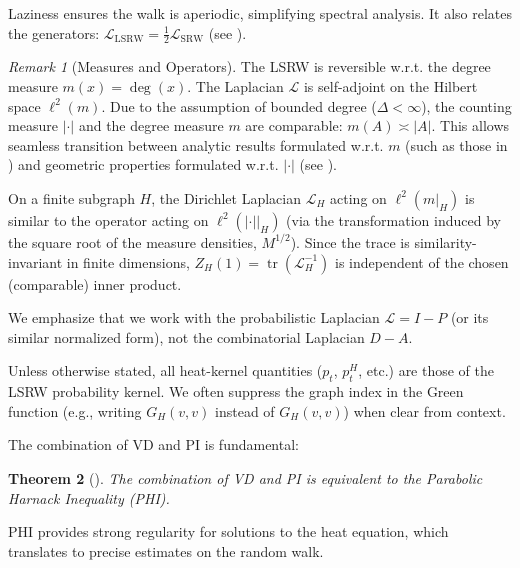 \documentclass{article}
\numberwithin{equation}{section}
\newtheorem{theorem}{Theorem}[section]
\theoremstyle{definition}
\theoremstyle{remark}
\newtheorem{remark}[theorem]{Remark}
\DeclareMathOperator{\tr}{tr}
\newcommand{\LL}{\mathcal{L}}
\begin{document}
Laziness ensures the walk is aperiodic, simplifying spectral analysis. It also relates the generators: $\LL_{\text{LSRW}} = \frac{1}{2} \LL_{\text{SRW}}$ (see ).

\begin{remark}[Measures and Operators]\label{rem:measures_operators}
The LSRW is reversible w.r.t. the degree measure $m(x)=\deg(x)$. The Laplacian $\LL$ is self-adjoint on the Hilbert space $\ell^2(m)$. Due to the assumption of bounded degree ($\Delta < \infty$), the counting measure $|\cdot|$ and the degree measure $m$ are comparable: $m(A) \asymp |A|$. This allows seamless transition between analytic results formulated w.r.t. $m$ (such as those in ) and geometric properties formulated w.r.t. $|\cdot|$ (see \cite{Coulhon03}).

On a finite subgraph $H$, the Dirichlet Laplacian $\LL_H$ acting on $\ell^2(m|_H)$ is similar to the operator acting on $\ell^2(|\cdot||_H)$ (via the transformation induced by the square root of the measure densities, $M^{1/2}$). Since the trace is similarity-invariant in finite dimensions, $Z_H(1) = \tr(\LL_H^{-1})$ is independent of the chosen (comparable) inner product.

We emphasize that we work with the probabilistic Laplacian $\LL=I-P$ (or its similar normalized form), not the combinatorial Laplacian $D-A$.

Unless otherwise stated, all heat-kernel quantities ($p_t$, $p_t^H$, etc.) are those of the LSRW probability kernel. We often suppress the graph index in the Green function (e.g., writing $G_H(v,v)$ instead of $G_{H}(v,v)$) when clear from context.
\end{remark}

The combination of VD and PI is fundamental:

\begin{theorem}[\cite{Delmotte99}]\label{thm:Delmotte}
The combination of VD and PI is equivalent to the Parabolic Harnack Inequality (PHI).
\end{theorem}

PHI provides strong regularity for solutions to the heat equation, which translates to precise estimates on the random walk.
\end{document}
